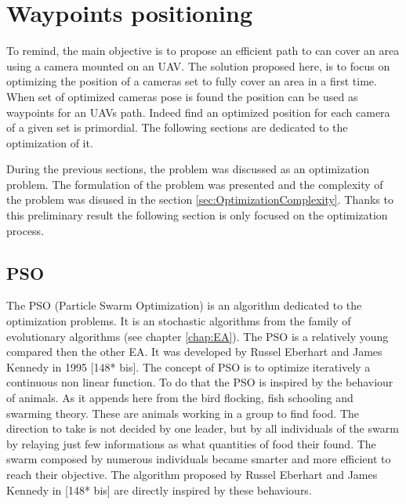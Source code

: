 \chapter{Waypoints positioning } 
\minitoc
To remind, the main objective is to propose an efficient path to can cover an area using a camera mounted on an UAV. The solution proposed here, is to focus on optimizing the position of a cameras set to fully cover an area in a first time. When set of optimized cameras pose is found the position can be used as waypoints for an UAVs path. Indeed find an optimized position for each camera of a given set is primordial. The following sections are dedicated to the optimization of it. 





During the previous sections, the problem was discussed as an optimization problem. The formulation of the problem was presented  and  the complexity of the problem was disused in the section \ref{sec:OptimizationComplexity}. Thanks to this preliminary result the following section is only focused on the optimization process. 



\section{PSO }

The PSO (Particle Swarm Optimization) is an algorithm dedicated to the optimization problems. It is an stochastic algorithms from the family of evolutionary algorithms (see  chapter \ref{chap:EA}). 
The PSO is a relatively young compared then the other EA. It was developed by Russel Eberhart and James Kennedy in 1995 [148* bis]. The concept of PSO is to optimize iteratively a continuous non linear function. To do that the PSO is inspired by the behaviour of animals. As it appends here from the bird flocking, fish schooling and swarming theory. These are animals working in a group to find food. 
The direction to take is not decided by one leader, but by all individuals of the swarm by relaying just few informations as what quantities of food their found. 
The swarm composed by numerous individuals became smarter and more efficient to reach their objective. 
The algorithm proposed by Russel Eberhart and James Kennedy in [148* bis] \cite{148*eberhart1995} are directly inspired by these behaviours.

